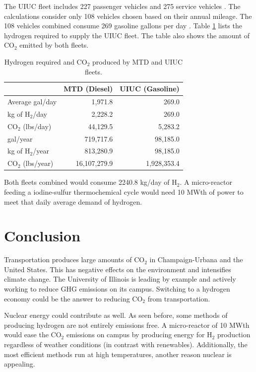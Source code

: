 \documentclass{anstrans}
\begin{document}
The UIUC fleet includes 227 passenger vehicles and 275 service vehicles \cite{noauthor_increase_2020}. The calculations consider only 108 vehicles chosen based on their annual mileage. The 108 vehicles combined consume 269 gasoline gallons per day \cite{holcomb_fueling_2015}. Table \ref{tab:h2req} lists the hydrogen required to supply the UIUC fleet. The table also shows the amount of CO$_2$ emitted by both fleets.

\begin{table}[]
	\centering
    \caption{Hydrogen required and CO$_2$ produced by MTD and UIUC fleets.}
    \label{tab:h2req}
\begin{tabular}{l|rr}
\hline
                   & MTD (Diesel)   & UIUC (Gasoline)  \\ \hline
Average gal/day    & 1,971.8        & 269.0            \\
kg of H$_2$/day    & 2,228.2        & 269.0            \\
CO$_2$ (lbs/day)   & 44,129.5       & 5,283.2          \\
gal/year           & 719,717.6      & 98,185.0         \\
kg of H$_2$/year   & 813,280.9      & 98,185.0         \\
CO$_2$ (lbs/year)  & 16,107,279.9   & 1,928,353.4      \\ \hline
\end{tabular}
\end{table}

Both fleets combined would consume 2240.8 kg/day of H$_2$. A micro-reactor feeding a iodine-sulfur thermochemical cycle would need 10 MWth of power to meet that daily average demand of hydrogen.

\section{Conclusion}

Transportation produces large amounts of CO$_2$ in Champaign-Urbana and the United States. This has negative effects on the environment and intensifies climate change. The University of Illinois is leading by example and actively working to reduce GHG emissions on its campus. Switching to a hydrogen economy could be the answer to reducing CO$_2$ from transportation.

Nuclear energy could contribute as well. As seen before, some methods of producing hydrogen are not entirely emissions free. A micro-reactor of 10 MWth would ease the CO$_2$ emissions on campus by producing energy for H$_2$ production regardless of weather conditions (in contrast with renewables). Additionally, the most efficient methods run at high temperatures, another reason nuclear is appealing.
\end{document}
